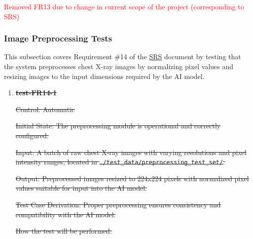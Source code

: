 \documentclass[12pt, titlepage]{article}
\begin{document}
\textcolor{red}{Removed FR13 due to change in current scope of the project (corresponding to SRS)}

\subsubsection{Image Preprocessing Tests}

This subsection covers Requirement \#14 of the \href{https://github.com/RezaJodeiri/CXR-Capstone/blob/main/docs/SRS/SRS.pdf}{SRS} \citep{SRS}
document by testing that the system preprocesses chest X-ray images by normalizing pixel values and resizing images to the input dimensions required by the AI model.

\begin{enumerate}

\item \textbf{\sout{test-FR14-1}} \label{test-FR14-1}

\sout{Control: Automatic}

\sout{Initial State: The preprocessing module is operational and correctly configured.}

\sout{Input: A batch of raw chest X-ray images with varying resolutions and pixel intensity ranges, located in \texttt{./test\_data/preprocessing\_test\_set/}.}

\sout{Output: Preprocessed images resized to 224x224 pixels with normalized pixel values suitable for input into the AI model.}

\sout{Test Case Derivation: Proper preprocessing ensures consistency and compatibility with the AI model.}

\sout{How the test will be performed:}


\end{enumerate}
\end{document}
